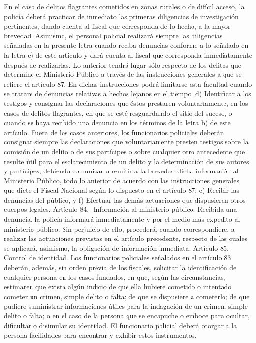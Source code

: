     En el caso de delitos flagrantes cometidos en zonas rurales o de difícil acceso, la policía deberá practicar de inmediato las primeras diligencias de investigación pertinentes, dando cuenta al fiscal que corresponda de lo hecho, a la mayor brevedad. Asimismo, el personal policial realizará siempre las diligencias señaladas en la presente letra cuando reciba denuncias conforme a lo señalado en la letra e) de este artículo y dará cuenta al fiscal que corresponda inmediatamente después de realizarlas. Lo anterior tendrá lugar sólo respecto de los delitos que determine el Ministerio Público a través de las instrucciones generales a que se refiere el artículo 87. En dichas instrucciones podrá limitarse esta facultad cuando se tratare de denuncias relativas a hechos lejanos en el tiempo.
    d) Identificar a los testigos y consignar las declaraciones que éstos prestaren voluntariamente, en los casos de delitos flagrantes, en que se esté resguardando el sitio del suceso, o cuando se haya recibido una denuncia en los términos de la letra b) de este artículo. Fuera de los casos anteriores, los funcionarios policiales deberán consignar siempre las declaraciones que voluntariamente presten testigos sobre la comisión de un delito o de sus partícipes o sobre cualquier otro antecedente que resulte útil para el esclarecimiento de un delito y la determinación de sus autores y partícipes, debiendo comunicar o remitir a la brevedad dicha información al Ministerio Público, todo lo anterior de acuerdo con las instrucciones generales que dicte el Fiscal Nacional según lo dispuesto en el artículo 87;
    e) Recibir las denuncias del público, y
    f) Efectuar las demás actuaciones que dispusieren otros cuerpos legales.
    Artículo 84.- Información al ministerio público. Recibida una denuncia, la policía informará inmediatamente y por el medio más expedito al ministerio público. Sin perjuicio de ello, procederá, cuando correspondiere, a realizar las actuaciones previstas en el artículo precedente, respecto de las cuales se aplicará, asimismo, la obligación de información inmediata.
    Artículo 85.- Control de identidad. Los funcionarios policiales señalados en el artículo 83 deberán, además, sin orden previa de los fiscales, solicitar la identificación de cualquier persona en los casos fundados, en que, según las circunstancias, estimaren que exista algún indicio de que ella hubiere cometido o intentado cometer un crimen, simple delito o falta; de que se dispusiere a cometerlo; de que pudiere suministrar informaciones útiles para la indagación de un crimen, simple delito o falta; o en el caso de la persona que se encapuche o emboce para ocultar, dificultar o disimular su identidad. El funcionario policial deberá otorgar a la persona facilidades para encontrar y exhibir estos instrumentos.
